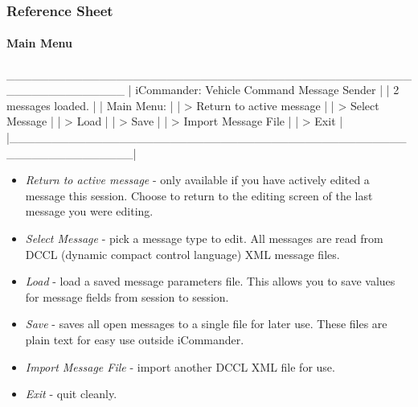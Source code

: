 \subsubsection{Reference Sheet}
\paragraph{Main Menu}
\begin{boxedverbatim}
 ______________________________________________________________
|            iCommander: Vehicle Command Message Sender        |
|                        2 messages loaded.                    |
|    Main Menu:                                                |
|    > Return to active message                                |
|    > Select Message                                          |
|    > Load                                                    |
|    > Save                                                    |
|    > Import Message File                                     |
|    > Exit                                                    |
|______________________________________________________________|
\end{boxedverbatim}
\resetbvlinenumber
\begin{itemize}
\item \textit{Return to active message} - only available if you have actively edited a message this session. Choose to return to the editing screen of the last message you were editing.
\item \textit{Select Message} - pick a message type to edit. All messages are read from DCCL (dynamic compact control language) XML message files.
\item \textit{Load} - load a saved message parameters file. This allows you to save values for message fields from session to session.
\item \textit{Save} - saves all open messages to a single file for later use. These files are plain text for easy use outside iCommander.
\item \textit{Import Message File} - import another DCCL XML file for use.
\item \textit{Exit} - quit cleanly.
\end{itemize}

